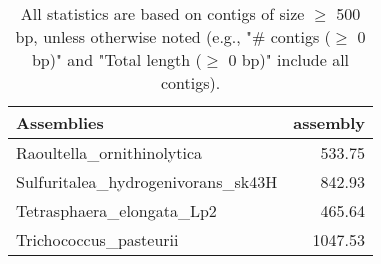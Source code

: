 \documentclass[12pt,a4paper]{article}
\begin{document}
\begin{table}[ht]
\begin{center}
\caption{All statistics are based on contigs of size $\geq$ 500 bp, unless otherwise noted (e.g., "\# contigs ($\geq$ 0 bp)" and "Total length ($\geq$ 0 bp)" include all contigs).}
\begin{tabular}{|l*{1}{|r}|}
\hline
Assemblies & assembly \\ \hline
Raoultella\_ornithinolytica & 533.75 \\ \hline
Sulfuritalea\_hydrogenivorans\_sk43H & 842.93 \\ \hline
Tetrasphaera\_elongata\_Lp2 & 465.64 \\ \hline
Trichococcus\_pasteurii & 1047.53 \\ \hline
\end{tabular}
\end{center}
\end{table}
\end{document}
